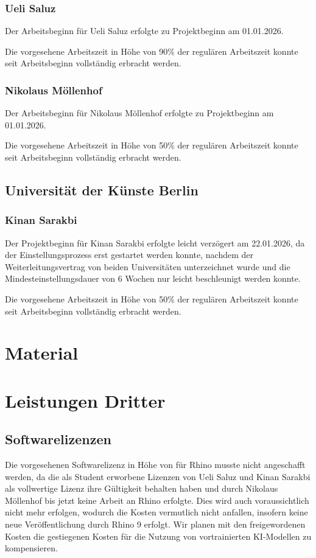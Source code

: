 \documentclass[type=zwischenbericht,theme=dark]{zukunftbau}
\begin{document}
\subsubsection{Ueli Saluz}
Der Arbeitsbeginn für Ueli Saluz erfolgte zu Projektbeginn am 01.01.2026.

Die vorgesehene Arbeitszeit in Höhe von 90\% der regulären Arbeitszeit konnte seit Arbeitsbeginn vollständig erbracht werden.

\subsubsection{Nikolaus Möllenhof}
Der Arbeitsbeginn für Nikolaus Möllenhof erfolgte zu Projektbeginn am 01.01.2026.

Die vorgesehene Arbeitszeit in Höhe von 50\% der regulären Arbeitszeit konnte seit Arbeitsbeginn vollständig erbracht werden.

\subsection{Universität der Künste Berlin}

\subsubsection{Kinan Sarakbi}
Der Projektbeginn für Kinan Sarakbi erfolgte leicht verzögert am 22.01.2026, da der Einstellungsprozess erst gestartet werden konnte, nachdem der Weiterleitungsvertrag von beiden Universitäten unterzeichnet wurde und die Mindesteinstellungsdauer von 6 Wochen nur leicht beschleunigt werden konnte.

Die vorgesehene Arbeitszeit in Höhe von 50\% der regulären Arbeitszeit konnte seit Arbeitsbeginn vollständig erbracht werden.

\section{Material}

\section{Leistungen Dritter}

\subsection{Softwarelizenzen}

Die vorgesehenen Softwarelizenz in Höhe von für Rhino musste nicht angeschafft werden, da die als Student erworbene Lizenzen von Ueli Saluz und Kinan Sarakbi als vollwertige Lizenz ihre Gültigkeit behalten haben und durch Nikolaus Möllenhof bis jetzt keine Arbeit an Rhino erfolgte. Dies wird auch voraussichtlich nicht mehr erfolgen, wodurch die Kosten vermutlich nicht anfallen, insofern keine neue Veröffentlichung durch Rhino 9 erfolgt. Wir planen mit den freigewordenen Kosten die gestiegenen Kosten für die Nutzung von vortrainierten KI-Modellen zu kompensieren.
\end{document}
